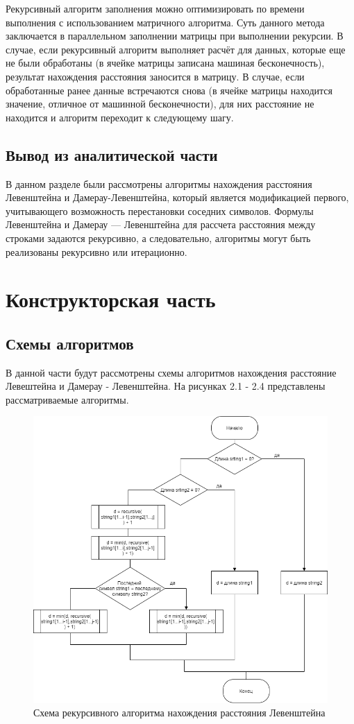 \documentclass[12pt]{report}
\begin{document}
Рекурсивный алгоритм заполнения можно оптимизировать по времени выполнения с использованием матричного алгоритма. Суть данного метода заключается в параллельном заполнении матрицы при выполнении рекурсии. В случае, если рекурсивный алгоритм выполняет расчёт для данных, которые еще не были обработаны (в ячейке матрицы записана машиная бесконечность), результат нахождения расстояния заносится в матрицу. В случае, если обработанные ранее данные встречаются снова (в ячейке матрицы находится значение, отличное от машинной бесконечности), для них расстояние не находится и алгоритм переходит к следующему шагу.

\section{Вывод из аналитической части}
	В данном разделе были рассмотрены алгоритмы нахождения расстояния Левенштейна и Дамерау-Левенштейна, который является модификацией первого, учитывающего возможность перестановки соседних символов. Формулы Левенштейна и Дамерау — Левенштейна для рассчета расстояния между строками задаются рекурсивно, а следовательно, алгоритмы могут быть реализованы рекурсивно или итерационно.
	
\clearpage

\chapter{Конструкторская часть}

\section{Схемы алгоритмов}
В данной части будут рассмотрены схемы алгоритмов нахождения расстояние Левештейна и Дамерау - Левенштейна. На рисунках 2.1 - 2.4 представлены рассматриваемые алгоритмы.\newline

\begin{figure}[hp!]
	\centering
	\includegraphics[width=0.85\linewidth]{report_files/recursive_levenshtein.png}
	\caption{Схема рекурсивного алгоритма нахождения расстояния Левенштейна}
	\label{fig:mpr}
\end{figure}
\end{document}
